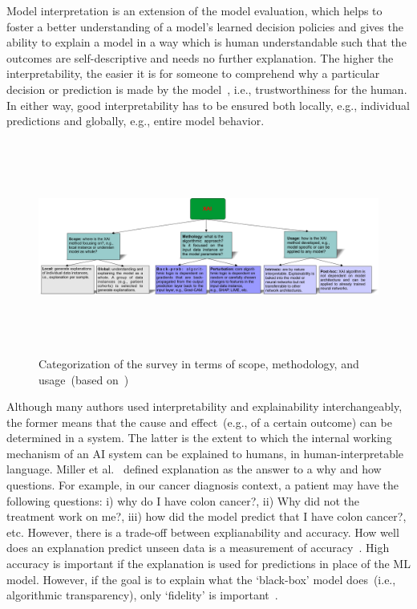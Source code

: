 \vspace{-6mm}
\hspace*{3.5mm} Model interpretation is an extension of the model evaluation, which helps to foster a better understanding of a model’s learned decision policies and gives the ability to explain a model in a way which is human understandable such that the outcomes are self-descriptive and needs no further explanation. 
The higher the interpretability, the easier it is for someone to comprehend why a particular decision or prediction is made by the model~\cite{stiglic2020interpretability,bhatt2020explainable}, i.e., trustworthiness for the human. In either way, good interpretability has to be ensured both locally, e.g., individual predictions and globally, e.g., entire model behavior. 

\begin{figure}[h]
	\centering
	\includegraphics[width=\textwidth,height=70mm]{images/xai_tec.png}	
    \caption{Categorization of the survey in terms of scope, methodology, and usage~(based on~\cite{das2020opportunities})}	
	\label{fig:survey_xai}
\end{figure}

\hspace*{3.5mm} Although many authors used interpretability and explainability interchangeably, the former means that the cause and effect~(e.g., of a certain outcome) can be determined in a system. The latter is the extent to which the internal working mechanism of an AI system can be explained to humans, in human-interpretable language. Miller et al.~\cite{miller2018explanation} defined explanation as the answer to a why and how questions. For example, in our cancer diagnosis context, a patient may have the following questions: i) why do I have colon cancer?, ii) Why did not the treatment work on me?, iii) how did the model predict that I have colon cancer?, etc. However, there is a trade-off between explianability and accuracy. How well does an explanation predict unseen data is a measurement of accuracy~\cite{molnar2019interpretable}. High accuracy is important if the explanation is used for predictions in place of the ML model. However, if the goal is to explain what the `black-box' model does~(i.e., algorithmic transparency), only `fidelity' is important~\cite{molnar2019interpretable}. 

